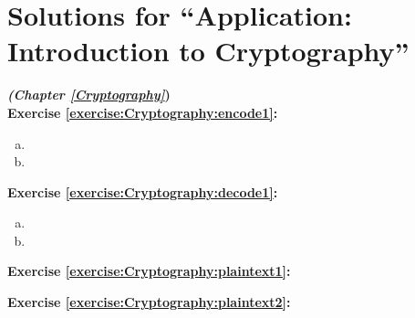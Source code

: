 
\section{Solutions for ``Application: Introduction to Cryptography''}
\label{sec:AnswerKey:Cryptography}
\noindent\textbf{\textit{ (Chapter \ref{Cryptography}})}\bigskip
\\
\noindent\textbf{Exercise \ref{exercise:Cryptography:encode1}:}
\begin{enumerate}[(a)]
\item
\item
\end{enumerate}

\noindent\textbf{Exercise \ref{exercise:Cryptography:decode1}:}
\begin{enumerate}[(a)]
\item
\item
\end{enumerate}



\noindent\textbf{Exercise \ref{exercise:Cryptography:plaintext1}:}  
%
%

\noindent\textbf{Exercise \ref{exercise:Cryptography:plaintext2}:}
%
%


